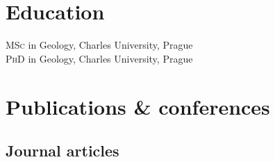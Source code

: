 \documentclass[11pt]{article} %
\begin{document}
\section*{Education}

\textsc{MSc} in Geology, Charles University, Prague\\
\textsc{PhD} in Geology, Charles University, Prague



\section*{Publications \& conferences}

\subsection*{Journal articles}
\end{document}

